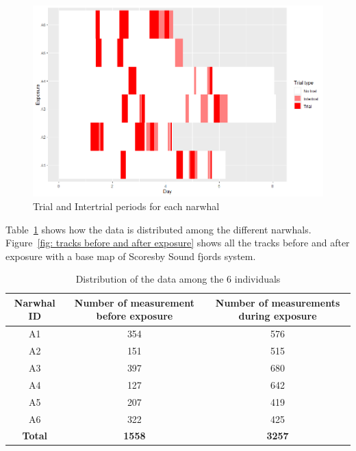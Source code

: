 \documentclass[aoas]{imsart}
\theoremstyle{definition}
\theoremstyle{remark}
\theoremstyle{remark}
\newcommand {\1}{\mathbb{1}}
\begin{document}
\begin{figure}[ht!]
	\centering
	\centering
	\includegraphics[scale=0.5]{images/data_exploration/trials.png}
	\caption{Trial and Intertrial periods for each narwhal}
	\label{fig: trials and intertrials distributions}
	
\end{figure}

Table~\ref{table: data distribution}  shows how the data is distributed among the different narwhals. Figure~\ref{fig: tracks before and after exposure} shows all the tracks before and after exposure with a base map of Scoresby Sound fjords system.

\begin{table}[ht!]
	\centering
	\begin{tabular}{|c|c|c|}
		\hline
		Narwhal ID & Number of measurement before exposure & Number of measurements during exposure \\
		\hline
		A1 & 354 & 576\\
		\hline
		A2  & 151 & 515 \\
		\hline
		A3 & 397 & 680 \\
		\hline
		A4 & 127 & 642  \\
		\hline
		A5 & 207 & 419\\
		\hline
		A6 & 322 & 425 \\
		\hline
		\textbf{Total} & \textbf{1558} & \textbf{3257} \\
		\hline
	\end{tabular}
	\caption{Distribution of the data among the 6 individuals}
	\label{table: data distribution}
\end{table}
\end{document}
